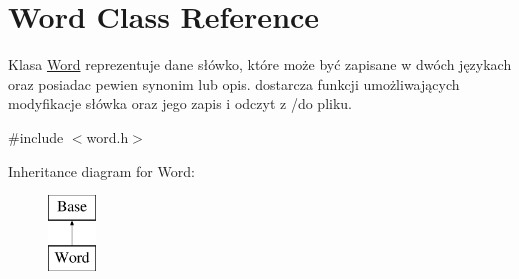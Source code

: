 \hypertarget{class_word}{}\section{Word Class Reference}
\label{class_word}


Klasa \mbox{\hyperlink{class_word}{Word}} reprezentuje dane słówko, które może być zapisane w dwóch językach oraz posiadac pewien synonim lub opis. dostarcza funkcji umożliwających modyfikacje słówka oraz jego zapis i odczyt z /do pliku.  




{\ttfamily \#include $<$word.\+h$>$}

Inheritance diagram for Word\+:\begin{figure}[H]
\begin{center}
\leavevmode
\includegraphics[height=2.000000cm]{class_word}
\end{center}
\end{figure}
